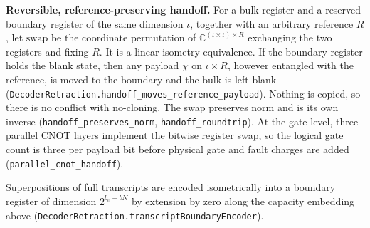 \documentclass[
]{article}
\begin{document}
\textbf{Reversible, reference-preserving handoff.} For a bulk register
and a reserved boundary register of the same dimension \(\iota\),
together with an arbitrary reference \(R\), let \(\mathrm{swap}\) be the
coordinate permutation of \(\mathbb C^{(\iota\times\iota)\times R}\)
exchanging the two registers and fixing \(R\). It is a linear isometry
equivalence. If the boundary register holds the blank state, then any
payload \(\chi\) on \(\iota\times R\), however entangled with the
reference, is moved to the boundary and the bulk is left blank
(\texttt{D\allowbreak{}e\allowbreak{}c\allowbreak{}o\allowbreak{}d\allowbreak{}e\allowbreak{}r\allowbreak{}R\allowbreak{}e\allowbreak{}t\allowbreak{}r\allowbreak{}a\allowbreak{}c\allowbreak{}t\allowbreak{}i\allowbreak{}o\allowbreak{}n\allowbreak{}.\allowbreak{}h\allowbreak{}a\allowbreak{}n\allowbreak{}d\allowbreak{}o\allowbreak{}f\allowbreak{}f\allowbreak{}\_\allowbreak{}m\allowbreak{}o\allowbreak{}v\allowbreak{}e\allowbreak{}s\allowbreak{}\_\allowbreak{}r\allowbreak{}e\allowbreak{}f\allowbreak{}e\allowbreak{}r\allowbreak{}e\allowbreak{}n\allowbreak{}c\allowbreak{}e\allowbreak{}\_\allowbreak{}p\allowbreak{}a\allowbreak{}y\allowbreak{}l\allowbreak{}o\allowbreak{}a\allowbreak{}d}).
Nothing is copied, so there is no conflict with no-cloning. The swap
preserves norm and is its own inverse
(\texttt{h\allowbreak{}a\allowbreak{}n\allowbreak{}d\allowbreak{}o\allowbreak{}f\allowbreak{}f\allowbreak{}\_\allowbreak{}p\allowbreak{}r\allowbreak{}e\allowbreak{}s\allowbreak{}e\allowbreak{}r\allowbreak{}v\allowbreak{}e\allowbreak{}s\allowbreak{}\_\allowbreak{}n\allowbreak{}o\allowbreak{}r\allowbreak{}m},
\texttt{h\allowbreak{}a\allowbreak{}n\allowbreak{}d\allowbreak{}o\allowbreak{}f\allowbreak{}f\allowbreak{}\_\allowbreak{}r\allowbreak{}o\allowbreak{}u\allowbreak{}n\allowbreak{}d\allowbreak{}t\allowbreak{}r\allowbreak{}i\allowbreak{}p}).
At the gate level, three parallel CNOT layers implement the bitwise
register swap, so the logical gate count is three per payload bit before
physical gate and fault charges are added
(\texttt{p\allowbreak{}a\allowbreak{}r\allowbreak{}a\allowbreak{}l\allowbreak{}l\allowbreak{}e\allowbreak{}l\allowbreak{}\_\allowbreak{}c\allowbreak{}n\allowbreak{}o\allowbreak{}t\allowbreak{}\_\allowbreak{}h\allowbreak{}a\allowbreak{}n\allowbreak{}d\allowbreak{}o\allowbreak{}f\allowbreak{}f}).

Superpositions of full transcripts are encoded isometrically into a
boundary register of dimension \(2^{b_0+bN}\) by extension by zero along
the capacity embedding above
(\texttt{D\allowbreak{}e\allowbreak{}c\allowbreak{}o\allowbreak{}d\allowbreak{}e\allowbreak{}r\allowbreak{}R\allowbreak{}e\allowbreak{}t\allowbreak{}r\allowbreak{}a\allowbreak{}c\allowbreak{}t\allowbreak{}i\allowbreak{}o\allowbreak{}n\allowbreak{}.\allowbreak{}t\allowbreak{}r\allowbreak{}a\allowbreak{}n\allowbreak{}s\allowbreak{}c\allowbreak{}r\allowbreak{}i\allowbreak{}p\allowbreak{}t\allowbreak{}B\allowbreak{}o\allowbreak{}u\allowbreak{}n\allowbreak{}d\allowbreak{}a\allowbreak{}r\allowbreak{}y\allowbreak{}E\allowbreak{}n\allowbreak{}c\allowbreak{}o\allowbreak{}d\allowbreak{}e\allowbreak{}r}).
\end{document}
